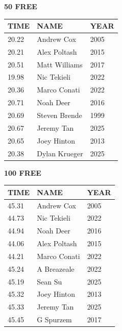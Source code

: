 \begin{table}[H]
\centering
\begin{minipage}[t]{0.48\textwidth}
\centering
\textbf{50 FREE}\\[0.1cm]
\begin{tabular}{@{}p{1.8cm}p{2.8cm}p{1.2cm}@{}}
\hline
    \textbf{TIME} & \textbf{NAME} & \textbf{YEAR} \\
\hline
    20.22 & Andrew Cox & 2005 \\
    20.21 & Alex Poltash & 2015 \\
    20.51 & Matt Williams & 2017 \\
    19.98 & Nic Tekieli & 2022 \\
    20.36 & Marco Conati & 2022 \\
    20.71 & Noah Deer & 2016 \\
    20.69 & Steven Brende & 1999 \\
    20.67 & Jeremy Tan & 2025 \\
    20.65 & Joey Hinton & 2013 \\
    20.38 & Dylan Krueger & 2025 \\
\hline
\end{tabular}
\end{minipage}\hfill
\begin{minipage}[t]{0.48\textwidth}
\centering
\textbf{100 FREE}\\[0.1cm]
\begin{tabular}{@{}p{1.8cm}p{2.8cm}p{1.2cm}@{}}
\hline
    \textbf{TIME} & \textbf{NAME} & \textbf{YEAR} \\
\hline
    45.31 & Andrew Cox & 2005 \\
    44.73 & Nic Tekieli & 2022 \\
    44.94 & Noah Deer & 2016 \\
    44.06 & Alex Poltash & 2015 \\
    44.21 & Marco Conati & 2022 \\
    45.24 & A Breazeale & 2022 \\
    45.19 & Sean Su & 2025 \\
    45.32 & Joey Hinton & 2013 \\
    45.33 & Jeremy Tan & 2025 \\
    45.45 & G Spurzem & 2017 \\
\hline
\end{tabular}
\end{minipage}
\end{table}

